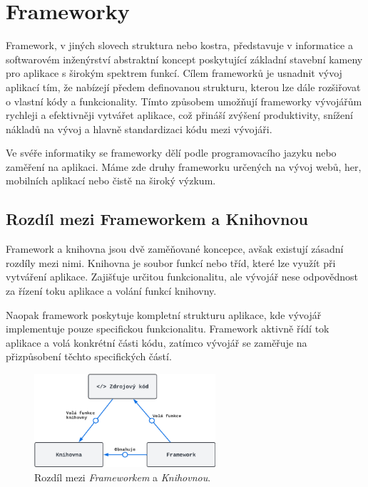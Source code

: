 \section{Frameworky}
\label{sec:dev-framework}
Framework, v jiných slovech struktura nebo kostra, představuje v informatice a softwarovém inženýrství abstraktní koncept poskytující základní stavební kameny pro aplikace s širokým spektrem funkcí. Cílem frameworků je usnadnit vývoj aplikací tím, že nabízejí předem definovanou strukturu, kterou lze dále rozšiřovat o vlastní kódy a funkcionality. Tímto způsobem umožňují frameworky vývojářům rychleji a efektivněji vytvářet aplikace, což přináší zvýšení produktivity, snížení nákladů na vývoj a hlavně standardizaci kódu mezi vývojáři.

Ve svéře informatiky se frameworky dělí podle programovacího jazyku nebo zaměření na aplikaci. Máme zde druhy frameworku určených na vývoj webů, her, mobilních aplikací nebo čistě na široký výzkum. \cite{about_framework}

\subsection*{Rozdíl mezi Frameworkem a Knihovnou}
Framework a knihovna jsou dvě zaměňované koncepce, avšak existují zásadní rozdíly mezi nimi. Knihovna je soubor funkcí nebo tříd, které lze využít při vytváření aplikace. Zajišťuje určitou funkcionalitu, ale vývojář nese odpovědnost za řízení toku aplikace a volání funkcí knihovny.

Naopak framework poskytuje kompletní strukturu aplikace, kde vývojář implementuje pouze specifickou funkcionalitu. Framework aktivně řídí tok aplikace a volá konkrétní části kódu, zatímco vývojář se zaměřuje na přizpůsobení těchto specifických částí.

\begin{figure}[H]
    \centering
    \includegraphics[width=0.6\textwidth]{diagrams/frameworkLibraryDiff}
    \caption{Rozdíl mezi \textit{Frameworkem} a \textit{Knihovnou}. \cite{framework_library_difference}}
    \label{fig:framework_library_difference}
\end{figure}


